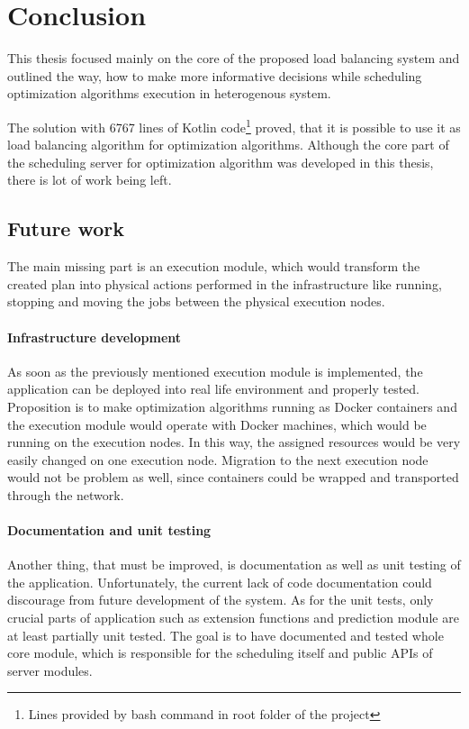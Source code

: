 \chapter{Conclusion}\label{ch:conclusion}
This thesis focused mainly on the core of the proposed load balancing system
and outlined the way,
how to make more informative decisions while scheduling optimization algorithms execution in heterogenous system.

The solution with 6767 lines of Kotlin 
code\footnote{Lines provided by  bash command in root folder of the project} 
proved, that it is possible to use it as load balancing algorithm for optimization algorithms.
Although the core part of the scheduling server for optimization algorithm was developed in this thesis,
there is lot of work being left.

\section{Future work}\label{sec:future-work}
The main missing part is an execution module, 
which would transform the created plan into physical actions performed in the infrastructure 
like running, stopping and moving the jobs between the physical execution nodes.

\subsubsection{Infrastructure development}
As soon as the previously mentioned execution module is implemented,
the application can be deployed into real life environment and properly tested.
Proposition is to make optimization algorithms running as Docker containers 
and the execution module would operate with Docker machines,
which would be running on the execution nodes. 
In this way, 
the assigned resources would be very easily changed on one execution node.
Migration to the next execution node would not be problem as well, 
since containers could be wrapped and transported through the network.

\subsubsection{Documentation and unit testing}
Another thing, that must be improved, is documentation as well as unit testing of the application.
Unfortunately, the current lack of code documentation could discourage from future development of the system.
As for the unit tests, 
only crucial parts of application such as extension functions and prediction module are at least partially unit tested.
The goal is to have documented and tested whole core module,
which is responsible for the scheduling itself and public APIs of server modules. 

